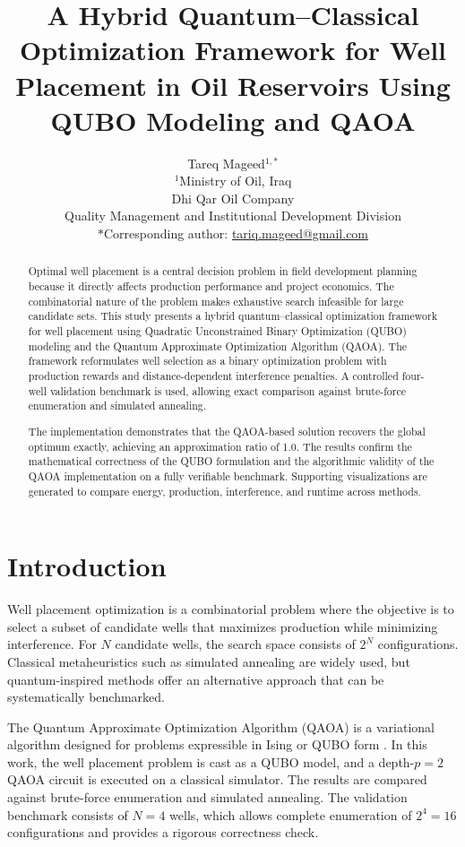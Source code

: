 \documentclass[12pt]{article}
\title{\textbf{A Hybrid Quantum--Classical Optimization Framework for Well Placement in Oil Reservoirs Using QUBO Modeling and QAOA}}
\author{
Tareq Mageed$^{1,\ast}$ \\[0.5em]
$^{1}$Ministry of Oil, Iraq \\ 
Dhi Qar Oil Company \\
Quality Management and Institutional Development Division \\[0.5em]
$\ast$Corresponding author: \href{mailto:tariq.mageed@gmail.com}{tariq.mageed@gmail.com}
}
\date{}
\begin{document}
\maketitle

\begin{abstract}
Optimal well placement is a central decision problem in field development planning because it directly affects production performance and project economics. The combinatorial nature of the problem makes exhaustive search infeasible for large candidate sets. This study presents a hybrid quantum--classical optimization framework for well placement using Quadratic Unconstrained Binary Optimization (QUBO) modeling and the Quantum Approximate Optimization Algorithm (QAOA). The framework reformulates well selection as a binary optimization problem with production rewards and distance-dependent interference penalties. A controlled four-well validation benchmark is used, allowing exact comparison against brute-force enumeration and simulated annealing.

The implementation demonstrates that the QAOA-based solution recovers the global optimum exactly, achieving an approximation ratio of 1.0. The results confirm the mathematical correctness of the QUBO formulation and the algorithmic validity of the QAOA implementation on a fully verifiable benchmark. Supporting visualizations are generated to compare energy, production, interference, and runtime across methods.
\end{abstract}

\section{Introduction}

Well placement optimization is a combinatorial problem where the objective is to select a subset of candidate wells that maximizes production while minimizing interference. For \(N\) candidate wells, the search space consists of \(2^{N}\) configurations. Classical metaheuristics such as simulated annealing are widely used, but quantum-inspired methods offer an alternative approach that can be systematically benchmarked.

The Quantum Approximate Optimization Algorithm (QAOA) is a variational algorithm designed for problems expressible in Ising or QUBO form \cite{farhi2014quantum}. In this work, the well placement problem is cast as a QUBO model, and a depth-\(p = 2\) QAOA circuit is executed on a classical simulator. The results are compared against brute-force enumeration and simulated annealing. The validation benchmark consists of \(N = 4\) wells, which allows complete enumeration of \(2^{4} = 16\) configurations and provides a rigorous correctness check.
\end{document}
